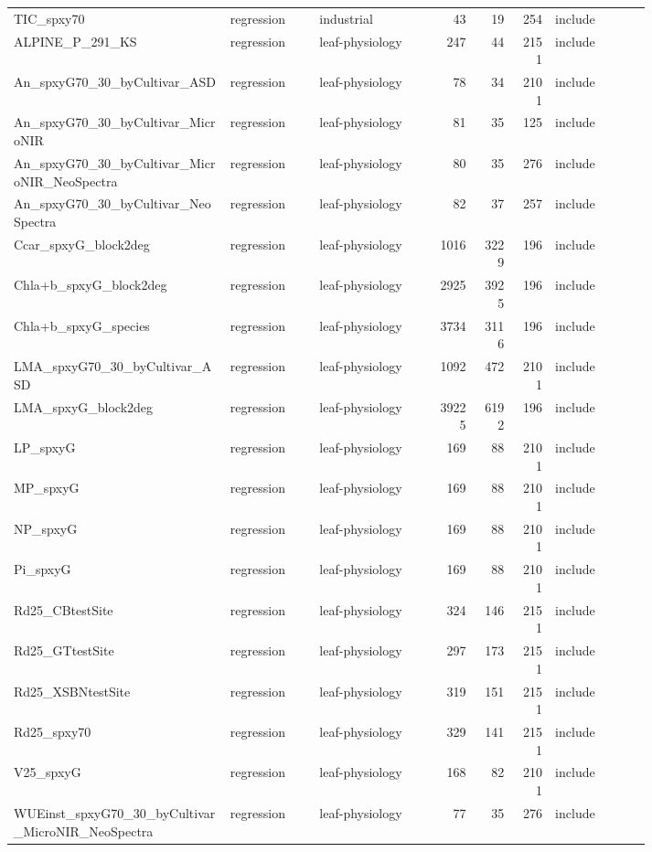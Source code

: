 \begin{longtable}{L{0.34\linewidth}L{0.14\linewidth}L{0.18\linewidth}rrrL{0.15\linewidth}}
TIC\_spxy70 & regression & industrial & 43 & 19 & 254 & include \\
ALPINE\_P\_291\_KS & regression & leaf-physiology & 247 & 44 & 2151 & include \\
An\_spxyG70\_30\_byCultivar\_ASD & regression & leaf-physiology & 78 & 34 & 2101 & include \\
An\_spxyG70\_30\_byCultivar\_MicroNIR & regression & leaf-physiology & 81 & 35 & 125 & include \\
An\_spxyG70\_30\_byCultivar\_MicroNIR\_NeoSpectra & regression & leaf-physiology & 80 & 35 & 276 & include \\
An\_spxyG70\_30\_byCultivar\_NeoSpectra & regression & leaf-physiology & 82 & 37 & 257 & include \\
Ccar\_spxyG\_block2deg & regression & leaf-physiology & 1016 & 3229 & 196 & include \\
Chla+b\_spxyG\_block2deg & regression & leaf-physiology & 2925 & 3925 & 196 & include \\
Chla+b\_spxyG\_species & regression & leaf-physiology & 3734 & 3116 & 196 & include \\
LMA\_spxyG70\_30\_byCultivar\_ASD & regression & leaf-physiology & 1092 & 472 & 2101 & include \\
LMA\_spxyG\_block2deg & regression & leaf-physiology & 39225 & 6192 & 196 & include \\
LP\_spxyG & regression & leaf-physiology & 169 & 88 & 2101 & include \\
MP\_spxyG & regression & leaf-physiology & 169 & 88 & 2101 & include \\
NP\_spxyG & regression & leaf-physiology & 169 & 88 & 2101 & include \\
Pi\_spxyG & regression & leaf-physiology & 169 & 88 & 2101 & include \\
Rd25\_CBtestSite & regression & leaf-physiology & 324 & 146 & 2151 & include \\
Rd25\_GTtestSite & regression & leaf-physiology & 297 & 173 & 2151 & include \\
Rd25\_XSBNtestSite & regression & leaf-physiology & 319 & 151 & 2151 & include \\
Rd25\_spxy70 & regression & leaf-physiology & 329 & 141 & 2151 & include \\
V25\_spxyG & regression & leaf-physiology & 168 & 82 & 2101 & include \\
WUEinst\_spxyG70\_30\_byCultivar\_MicroNIR\_NeoSpectra & regression & leaf-physiology & 77 & 35 & 276 & include \\

\end{longtable}
